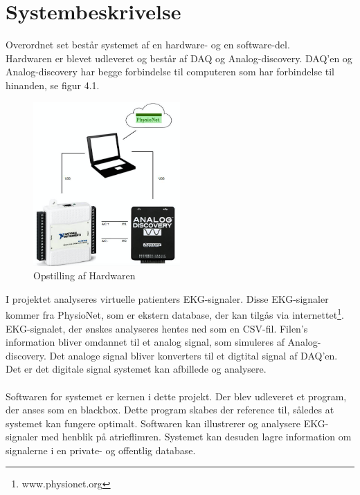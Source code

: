 \chapter{Systembeskrivelse}

Overordnet set består systemet af en hardware- og en software-del.\\ Hardwaren er blevet udleveret og består af DAQ og Analog-discovery. DAQ'en og Analog-discovery har begge forbindelse til computeren som har forbindelse til hinanden, se figur 4.1.  

\begin{figure}[H]
	\centering
	\includegraphics[width=0.5\textwidth]{Figurer/Snip20150427_1}
	\caption{Opstilling af Hardwaren}
\end{figure}

I projektet analyseres virtuelle patienters EKG-signaler. Disse EKG-signaler kommer fra PhysioNet, som er ekstern database, der kan tilgås via internettet\footnote{www.physionet.org}. EKG-signalet, der ønskes analyseres hentes ned som en CSV-fil. Filen's information bliver omdannet til et analog signal, som simuleres af Analog-discovery. Det analoge signal bliver konverters til et digtital signal af DAQ'en. Det er det digitale signal systemet kan afbillede og analysere.
\\ \\
Softwaren for systemet er kernen i dette projekt. Der blev udleveret et program, der anses som en blackbox. Dette program skabes der reference til, således at systemet kan fungere optimalt. Softwaren kan illustrerer og analysere EKG-signaler med henblik på atrieflimren. Systemet kan desuden lagre information om signalerne i en private- og offentlig database.           

